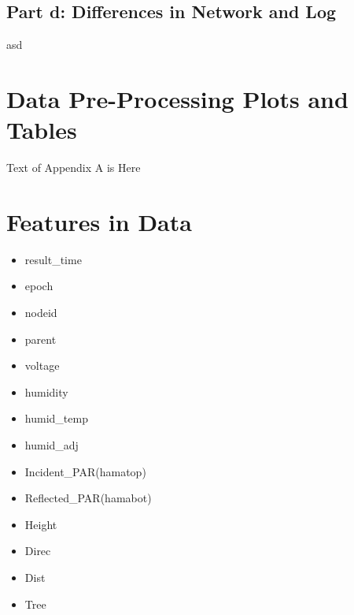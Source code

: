 \documentclass[11pt, letterpaper]{article}
\begin{document}
\subsection{Part d: Differences in Network and Log}

asd

\pagebreak

\begin{appendices}
\section{Data Pre-Processing Plots and Tables}

Text of Appendix A is Here

\section{Features in Data}

\begin{multicols}{3}
\begin{itemize}
    \item result\_time
    \item epoch
    \item nodeid
    \item parent
    \item voltage
    \item humidity
    \item humid\_temp
    \item humid\_adj
    \item Incident\_PAR(hamatop)
    \item Reflected\_PAR(hamabot)
    \item Height
    \item Direc
    \item Dist
    \item Tree
\end{itemize}
\end{multicols}

\end{appendices}
\end{document}
